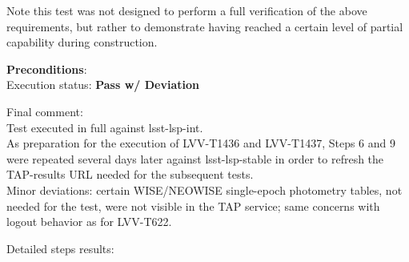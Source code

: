 \documentclass[DM,STR,toc]{lsstdoc}
\begin{document}
Note this test was not designed to perform a full verification of the
above requirements, but rather to demonstrate having reached a certain
level of partial capability during construction.


\textbf{ Preconditions}:\\


Execution status: {\bf Pass w/ Deviation }

Final comment:\\Test executed in full against lsst-lsp-int.\\
As preparation for the execution of LVV-T1436 and LVV-T1437, Steps 6 and
9 were repeated several days later against lsst-lsp-stable in order to
refresh the TAP-results URL needed for the subsequent tests.\\
Minor deviations: certain WISE/NEOWISE single-epoch photometry tables,
not needed for the test, were not visible in the TAP service; same
concerns with logout behavior as for LVV-T622.



Detailed steps results:
\end{document}
